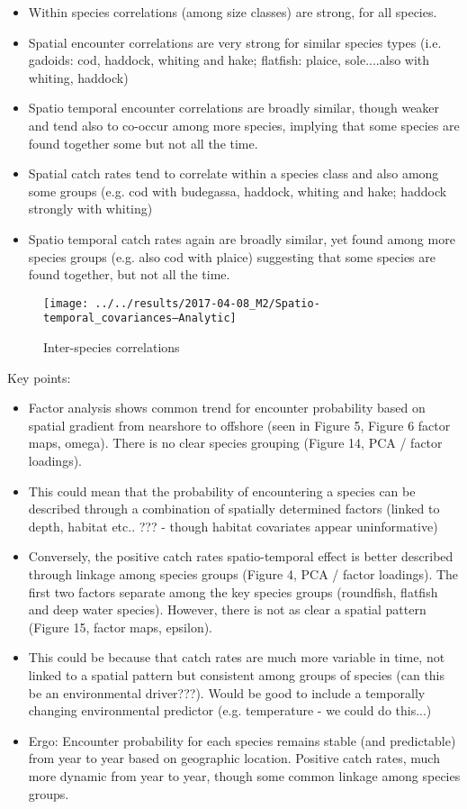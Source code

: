 \documentclass[11pt]{article}
\begin{document}
\begin{itemize}
	\item Within species correlations (among size classes) are strong, for all species. 
	\item Spatial encounter correlations are very strong for similar
		species types (i.e. gadoids: cod, haddock, whiting and hake;
		flatfish: plaice, sole....also with whiting, haddock)
	\item Spatio temporal encounter correlations are broadly similar,
		though weaker and tend also to co-occur among more species,
		implying that some species are found together some but not all
		the time.
	\item  Spatial catch rates tend to correlate within a species class and
		also among some groups (e.g. cod with budegassa, haddock,
		whiting and hake; haddock strongly with whiting)
	\item Spatio temporal catch rates again are broadly similar, yet found
		among more species groups (e.g. also cod with plaice)
		suggesting that some species are found together, but not all
		the time.

\end{itemize}

\begin{figure}[!ht]
	\texttt{[image: ../../results/2017-04-08\_M2/Spatio-temporal\_covariances--Analytic]}
	\label{fig:Corr}
	\caption{Inter-species correlations}
\end{figure}

\newpage

Key points:
\begin{itemize}
	\item Factor analysis shows common trend for encounter probability
		based on spatial gradient from nearshore to offshore (seen in
		Figure 5, Figure 6 factor maps, omega). There is no clear species
		grouping (Figure 14, PCA / factor loadings). 
	\item This could mean that the probability of encountering a species
		can be described through a combination of spatially determined
		factors (linked to depth, habitat etc.. ??? - though habitat
		covariates appear uninformative) 
	\item Conversely, the positive catch rates spatio-temporal effect is
		better described through linkage among species groups (Figure
		4, PCA / factor loadings). The first two factors separate among
		the key species groups (roundfish, flatfish and deep water
		species). However, there is not as clear a spatial pattern
		(Figure 15, factor maps, epsilon).
	\item 	This could be because that catch rates are much more variable
		in time, not linked to a spatial pattern but consistent among
		groups of species (can this be an environmental driver???).
		Would be good to include a temporally changing environmental
		predictor (e.g. temperature - we could do this...) 
	\item Ergo: Encounter probability for each species remains stable (and
		predictable) from year to year based on geographic location.
		Positive catch rates, much more dynamic from year to year,
		though some common linkage among species groups.
\end{itemize}
\end{document}
